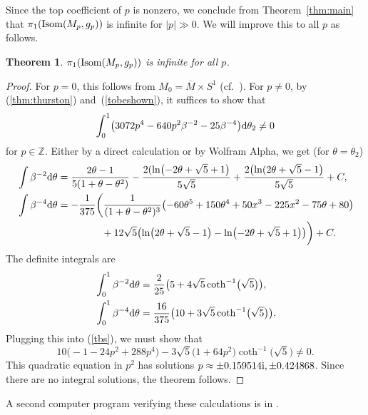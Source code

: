 \documentclass[10pt,a4paper]{amsart}
\numberwithin{equation}{section}
\newtheorem{Theorem}{Theorem}[section]
\theoremstyle{definition}
\newcommand{\BbZ}{{\mathbb Z}}
\newcommand{\Z}{\BbZ}
\newcommand{\om}{\overline{M}}
\newcommand{\omz}{M_0}
\newcommand{\omp}{M_p}
\begin{document}
Since the top coefficient of $p$ is nonzero, we conclude from Theorem~\ref{thm:main} that
$\pi_1({\rm Isom}(\omp,g_p))$ is infinite for $|p| \gg 0$. We will improve this to all $p$ as follows.

\begin{Theorem}%
$\pi_1({\rm Isom}(\omp,g_p))$ is infinite for all $p$.
\end{Theorem}

\begin{proof} For $p=0$, this follows from $\omz = \om \times S^1$ (cf.\ \cite[Remark~3.2]{MRT4}).
For $p\neq 0$, by (\ref{thm:thurston}) and~(\ref{tobeshown}), it suffices to show that
\begin{equation}\label{tbs}
 \int_0^1\bigl(3072p^4 -640p^2\beta^{-2} -25\beta^{-4}\bigr){\rm d}\theta_2\neq 0
\end{equation}
for $p\in \Z$. Either by a direct calculation or by Wolfram Alpha, we get (for $\theta= \theta_2$)
\begin{align*}
&\int \beta^{-2}{\rm d}\theta= \frac{2\theta-1}{5(1+\theta-\theta^2)} -
\frac{2(\ln\bigl( -2\theta+ \sqrt{5} + 1\bigr)}{5\sqrt{5}} + \frac{2\bigl(\ln( 2\theta+ \sqrt{5} - 1\bigr)}{5\sqrt{5}} + C, \\
&\int \beta^{-4} {\rm d}\theta=-\frac{1}{375}\biggl( \frac{1}{(1+\theta-\theta^2)^3}\bigl(-60\theta^5+150 \theta^4
+50x^3-225x^2-75\theta+ 80\bigr) \\
&\hphantom{\int \beta^{-4} {\rm d}\theta=-\frac{1}{375}\biggl(}{}
+12\sqrt{5}\bigl(\ln\bigl(2\theta+ \sqrt{5}- 1\bigr)-\ln\bigl(-2\theta+\sqrt{5}+1\bigr)\bigr)
\biggr) +C.
\end{align*}
The definite integrals are
\begin{align*}
&\int_0^1 \beta^{-2}{\rm d}\theta= \frac{2}{25}\bigl( 5+4\sqrt{5}\coth^{-1}\bigl(\sqrt{5}\bigr)\bigr),\\
& \int_0^1 \beta^{-4}{\rm d}\theta=\frac{16}{375}\bigl( 10+3\sqrt{5}\coth^{-1}\bigl(\sqrt{5}\bigr)\bigr).
 \end{align*}
 Plugging this into (\ref{tbs}), we must show that
\[10\bigl(-1 - 24p^2 + 288 p^4\bigr) -3\sqrt{5}\bigl(1+64p^2\bigr) \coth^{-1}\bigl(\sqrt{5}\bigr)\neq 0.\]
This quadratic equation in $p^2$ has solutions $p \approx \pm 0.159514 {\rm i}, \pm 0.424868$. Since there are no integral solutions, the theorem
 follows.
 \end{proof}

 A second computer program verifying these calculations is in \cite{Egi1}.
\end{document}
